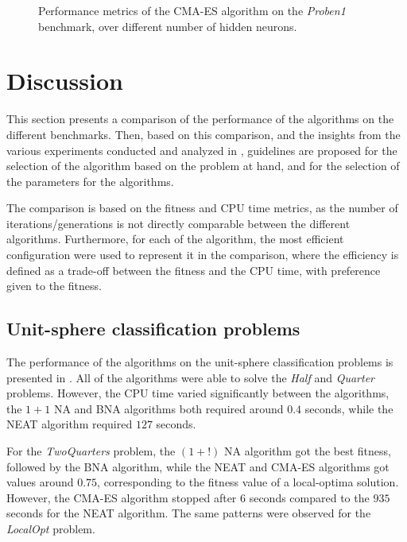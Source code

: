 \begin{figure}
\begin{center}
    \end{center}
    \caption{Performance metrics of the CMA-ES algorithm on the \textit{Proben1} benchmark, over different number of hidden neurons.}
    \label{fig:cmaes_proben1}
\end{figure}

\section{Discussion}

This section presents a comparison of the performance of the algorithms on the different benchmarks.
Then, based on this comparison, and the insights from the various experiments conducted and analyzed in , guidelines are proposed for the selection of the algorithm
based on the problem at hand, and for the selection of the parameters for the algorithms.

The comparison is based on the fitness and CPU time metrics, as the number of iterations/generations is not directly comparable between the different algorithms.
Furthermore, for each of the algorithm, the most efficient configuration were used to represent it in the comparison, where the efficiency is defined as a trade-off between the fitness
and the CPU time, with preference given to the fitness.

\subsection{Unit-sphere classification problems}

The performance of the algorithms on the unit-sphere classification problems is presented in .
All of the algorithms were able to solve the \textit{Half} and \textit{Quarter} problems.  However, the CPU time varied significantly between the algorithms, the $1 + 1$ NA and BNA algorithms
both required around $0.4$ seconds, while the NEAT algorithm required $127$ seconds.

For the \textit{TwoQuarters} problem, the $(1 + !)$ NA algorithm got the best fitness, followed by the BNA algorithm, while the NEAT and CMA-ES algorithms got values around $0.75$,
corresponding to the fitness value of a local-optima solution. However, the CMA-ES algorithm stopped after $6$ seconds compared to the $935$ seconds for the NEAT algorithm.
The same patterns were observed for the \textit{LocalOpt} problem.

